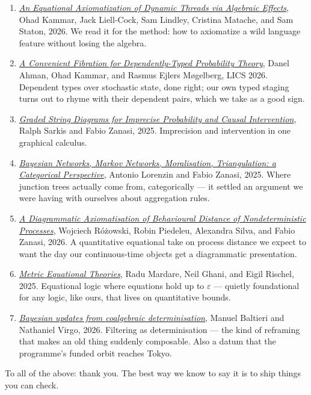 \begin{enumerate}
{{    imprecise probability}}, Jack Liell-Cock and Sam Staton, 2024. A
    compositional account of the imprecision that our
    bounded-probability judgments live inside.
  \item \href{https://arxiv.org/abs/2602.05850}{\emph{An Equational
    Axiomatization of Dynamic Threads via Algebraic Effects}}, Ohad
    Kammar, Jack Liell-Cock, Sam Lindley, Cristina Matache, and Sam
    Staton, 2026.
    We read it for the method: how to axiomatize a wild language
    feature without losing the algebra.
  \item \href{https://doi.org/10.4230/LIPIcs.LICS.2026.4}{\emph{A
    Convenient Fibration for Dependently-Typed Probability Theory}},
    Danel Ahman, Ohad Kammar, and Rasmus Ejlers M\o{}gelberg, LICS
    2026. Dependent types over stochastic state, done right; our own
    typed staging turns out to rhyme with their dependent pairs,
    which we take as a good sign.
  \item \href{https://arxiv.org/abs/2501.18404}{\emph{Graded String
    Diagrams for Imprecise Probability and Causal Intervention}},
    Ralph Sarkis and Fabio Zanasi, 2025. Imprecision and intervention
    in one graphical calculus.
  \item \href{https://arxiv.org/abs/2512.09908}{\emph{Bayesian
    Networks, Markov Networks, Moralisation, Triangulation: a
    Categorical Perspective}}, Antonio Lorenzin and Fabio Zanasi,
    2025. Where junction trees actually come from, categorically ---
    it settled an argument we were having with ourselves about
    aggregation rules.
  \item \href{https://arxiv.org/abs/2604.27268}{\emph{A Diagrammatic
    Axiomatisation of Behavioural Distance of Nondeterministic
    Processes}}, Wojciech R\'o\.zowski, Robin Piedeleu, Alexandra
    Silva, and Fabio Zanasi, 2026. A quantitative equational take on
    process distance we expect to want the day our continuous-time
    objects get a diagrammatic presentation.
  \item \href{https://arxiv.org/abs/2509.14094}{\emph{Metric
    Equational Theories}}, Radu Mardare, Neil Ghani, and Eigil
    Rischel, 2025. Equational logic where equations hold up to
    $\varepsilon$ --- quietly foundational for any logic, like ours,
    that lives on quantitative bounds.
  \item \href{https://arxiv.org/abs/2607.00034}{\emph{Bayesian
    updates from coalgebraic determinisation}}, Manuel Baltieri and
    Nathaniel Virgo, 2026. Filtering as determinisation --- the kind
    of reframing that makes an old thing suddenly composable. Also a
    datum that the programme's funded orbit reaches Tokyo.
\end{enumerate}

To all of the above: thank you. The best way we know to say it is to
ship things you can check.
